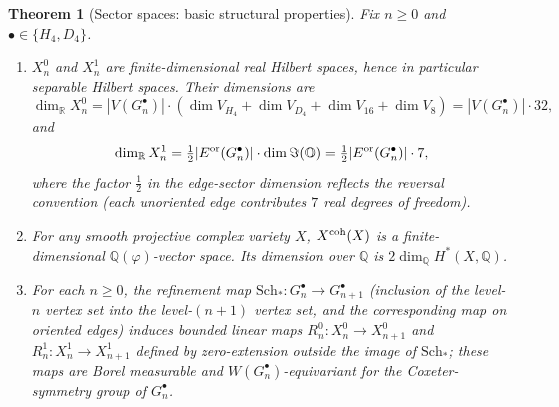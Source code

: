 \documentclass[11pt, a4paper]{amsart}
\newtheorem{theorem}{Theorem}[section]
\theoremstyle{definition}
\newcommand{\R}{\mathbb{R}}
\newcommand{\Q}{\mathbb{Q}}
\newcommand{\OO}{\mathbb{O}}
\newcommand{\pphi}{\varphi}
\newcommand{\co}{{\rm coh}}
\begin{document}
\begin{theorem}[Sector spaces: basic structural properties]
\label{thm:hilbert}
Fix $n \geq 0$ and $\bullet \in \{H_4, D_4\}$.
\begin{enumerate}
\item $X_n^0$ and $X_n^1$ are finite-dimensional real Hilbert
  spaces, hence in particular separable Hilbert spaces. Their
  dimensions are
  \[
    \dim_\R X_n^0 = |V(G_n^\bullet)| \cdot
    (\dim V_{H_4} + \dim V_{D_4} + \dim V_{16} + \dim V_8)
    = |V(G_n^\bullet)| \cdot 32,
  \]
  and
  \[
    \dim_\R X_n^1 = \tfrac{1}{2} |E^{\rm or}(G_n^\bullet)| \cdot
    \dim \Im(\OO) = \tfrac{1}{2} |E^{\rm or}(G_n^\bullet)| \cdot 7,
  \]
  where the factor $\tfrac{1}{2}$ in the edge-sector dimension
  reflects the reversal convention (each unoriented edge
  contributes $7$ real degrees of freedom).
\item For any smooth projective complex variety $X$, $X^{\co}(X)$
  is a finite-dimensional $\Q(\pphi)$-vector space. Its dimension
  over $\Q$ is $2 \dim_{\Q} H^*(X, \Q)$.
\item For each $n \geq 0$, the refinement map
  $\mathrm{Sch}_\ast \colon G_n^\bullet \to G_{n+1}^\bullet$
  (inclusion of the level-$n$ vertex set into the level-$(n+1)$
  vertex set, and the corresponding map on oriented edges) induces
  bounded linear maps
  $R_n^0 \colon X_n^0 \to X_{n+1}^0$ and
  $R_n^1 \colon X_n^1 \to X_{n+1}^1$
  defined by zero-extension outside the image of
  $\mathrm{Sch}_\ast$; these maps are Borel measurable and
  $W(G_n^\bullet)$-equivariant for the Coxeter-symmetry group
  of $G_n^\bullet$.
\end{enumerate}
\end{theorem}
\end{document}

